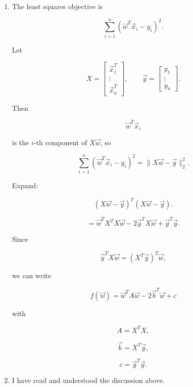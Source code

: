 \documentclass[
  12pt,
]{fphw}
\begin{document}
\begin{enumerate}
\bigskip

\item[(d)]

The least squares objective is

\[
\sum_{i=1}^n (\vec w^T \vec x_i - y_i)^2.
\]

Let

\[
X=
\begin{bmatrix}
\vec x_1^T\\
\vdots\\
\vec x_n^T
\end{bmatrix},
\qquad
\vec y=
\begin{bmatrix}
y_1\\
\vdots\\
y_n
\end{bmatrix}.
\]

Then

\[
\vec w^T\vec x_i
\]

is the $i$-th component of $X\vec w$, so

\[
\sum_{i=1}^n (\vec w^T\vec x_i-y_i)^2
=
\|X\vec w-\vec y\|_2^2.
\]

Expand:

\[
(X\vec w-\vec y)^T(X\vec w-\vec y).
\]

\[
=
\vec w^T X^T X \vec w
-
2\vec y^T X \vec w
+
\vec y^T \vec y.
\]

Since

\[
\vec y^T X \vec w=(X^T\vec y)^T\vec w,
\]

we can write

\[
f(\vec w)=\vec w^T A \vec w-2\vec b^T\vec w+c
\]

with

\[
A=X^TX,
\]

\[
\vec b=X^T\vec y,
\]

\[
c=\vec y^T\vec y.
\]

\bigskip

\item[(e)]

I have read and understood the discussion above.

\end{enumerate}

\newpage
\end{document}
